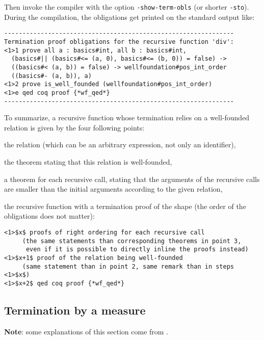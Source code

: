 Then invoke the {\focalizec} compiler with the option {\tt -show-term-obls}
(or shorter {\tt -sto}).
During the compilation, the obligations get printed on the standard output
like:

\noindent
{\scriptsize
\begin{verbatim}
---------------------------------------------------------------
Termination proof obligations for the recursive function 'div':
<1>1 prove all a : basics#int, all b : basics#int,
  (basics#|| (basics#<= (a, 0), basics#<= (b, 0)) = false) ->
  ((basics#< (a, b)) = false) -> wellfoundation#pos_int_order
  ((basics#- (a, b)), a)
<1>2 prove is_well_founded (wellfoundation#pos_int_order)
<1>e qed coq proof {*wf_qed*}
---------------------------------------------------------------
\end{verbatim}
}

To summarize, a recursive function whose termination relies on a well-founded
relation is given by the four following points:

\begin{compact-enumerate}
\item the relation (which can be an arbitrary expression, not only an
      identifier),
\item the theorem stating that this relation is well-founded,
\item a theorem for each recursive call, stating that the arguments
  of the recursive calls are smaller than the initial arguments
  according to the given relation,
\item the recursive function with a termination proof of the shape
  (the order of the obligations does not matter):
  \noindent
  {\scriptsize
  \begin{lstlisting}[mathescape=true,frame=none]
<1>$x$ proofs of right ordering for each recursive call
     (the same statements than corresponding theorems in point 3,
      even if it is possible to directly inline the proofs instead)
<1>$x+1$ proof of the relation being well-founded
     (same statement than in point 2, same remark than in steps <1>$x$)
<1>$x+2$ qed coq proof {*wf_qed*}
  \end{lstlisting}
  }
\end{compact-enumerate}



\subsection{Termination by a measure}
{\bf Note}: some explanations of this section come from
\cite{Dubois-Pessaux-termproofs-TFP2015}.

